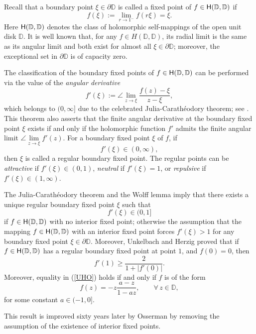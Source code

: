 \documentclass{amsart}
\theoremstyle{definition}
\theoremstyle{remark}
\numberwithin{equation}{section}
\begin{document}
Recall that a boundary point $\xi\in\partial \mathbb D$ is called a fixed point of $f\in {\rm{\textsf{H}}}(\mathbb D, \mathbb D)$ if
$$f(\xi):=\lim\limits_{r\rightarrow 1^-}f(r\xi)=\xi.$$
Here  ${\rm{\textsf{H}}}(\mathbb D, \mathbb D)$ denotes the class of holomorphic self-mappings of the open unit disk $\mathbb D$. It is well known that, for any  $f\in H(\mathbb D, \mathbb D)$,  its radial limit is the same as its angular limit and both exist for almost all $\xi\in\partial \mathbb D$; moreover, the exceptional set in  $\partial \mathbb D$
is of capacity zero.

The classification of the boundary fixed points of $f\in {\rm{\textsf{H}}}(\mathbb D, \mathbb D)$ can be performed via the value of the \emph{angular derivative}
$$f'(\xi):=\angle\lim\limits_{z\rightarrow \xi}\frac{f(z)-\xi}{z-\xi},$$
which belongs to $(0,\infty]$ due to  the celebrated Julia-Carath\'{e}odory theorem; see \cite{Caratheodory,Abate}. This theorem also asserts that the finite angular derivative at the boundary fixed point $\xi$ exists if and only if the holomorphic function $f'$ admits  the finite angular limit $\angle\lim\limits_{z\rightarrow \xi}f'(z)$. For a boundary fixed point $\xi$ of $f$,
if $$f'(\xi)\in (0,\infty),$$ then
$\xi$ is called a regular  boundary  fixed  point. The regular points can be \emph{attractive} if $f'(\xi)\in (0,1)$, \emph{neutral} if $f'(\xi)=1$, or \emph{repulsive} if $f'(\xi)\in (1,\infty)$.

The  Julia-Carath\'{e}odory theorem \cite{Caratheodory, Abate} and the Wolff lemma \cite{Wolff2} imply that  there exists a unique regular boundary fixed point $\xi$ such that $$f'(\xi)\in (0,1]$$
if $f\in {\rm{\textsf{H}}}(\mathbb D, \mathbb D)$ with no interior fixed point; otherwise the assumption that the mapping $f\in {\rm{\textsf{H}}}(\mathbb D, \mathbb D)$ with an interior fixed point forces  $f'(\xi)>1$
for any boundary fixed point $\xi\in\partial \mathbb D$.
Moreover, Unkelbach \cite{Unkelbach} and  Herzig  \cite{Herzig} proved that if $f\in {\rm{\textsf{H}}}(\mathbb D, \mathbb D)$ has a regular boundary fixed point at point $1$, and $f(0)=0$, then
\begin{equation}\label{UHO}
f'(1)\geq\frac{2}{1+|f'(0)|}.
\end{equation}
Moreover, equality in (\ref{UHO}) holds if and only if $f$ is of the form
$$f(z)=-z\frac{a-z}{1-az},\qquad \forall\,z\in\mathbb D,$$
for some constant $a\in (-1, 0 ]$.

This result is improved sixty  years later by
  Osserman \cite{Osserman} by removing the assumption of the existence of interior fixed points.
\end{document}
